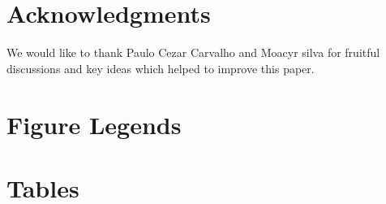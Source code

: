\documentclass[10pt]{article}
\begin{document}
\section*{Acknowledgments}
We would like to thank Paulo Cezar Carvalho and Moacyr silva for fruitful discussions and key ideas which helped to improve this paper.



\section*{Figure Legends}


\section*{Tables}
\end{document}
